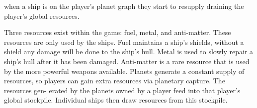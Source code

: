		when a ship is on the player's planet graph they start to resupply draining the player's global resources.





Three resources exist within the game: fuel, metal, and anti-matter. These resources are only used by the ships. Fuel maintains a ship’s shields, without a shield any damage will be done to the ship’s hull. Metal is used to slowly repair a ship’s hull after it has been damaged. Anti-matter is a rare resource that is used by the more powerful weapons available.
Planets generate a constant supply of resources, so players can gain extra resources via planetary capture. The resources gen- erated by the planets owned by a player feed into that player’s global stockpile. Individual ships then draw resources from this stockpile.